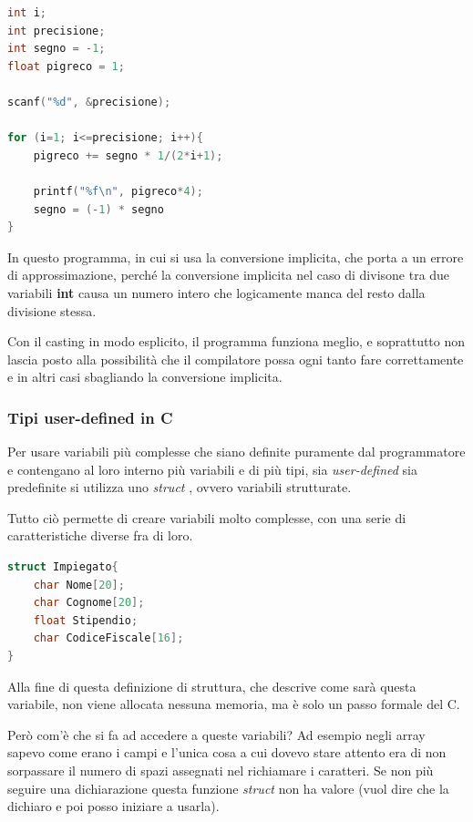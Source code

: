 \documentclass[
  paper=a4,
  oneside  ,captions=tableheading
]{scrbook}
\begin{document}
\begin{lstlisting}[language=C]
int i;
int precisione;
int segno = -1;
float pigreco = 1;

scanf("%d", &precisione);

for (i=1; i<=precisione; i++){
    pigreco += segno * 1/(2*i+1);
    
    printf("%f\n", pigreco*4);
    segno = (-1) * segno
}
\end{lstlisting}

In questo programma, in cui si usa la conversione implicita, che porta a
un errore di approssimazione, perché la conversione implicita nel caso
di divisone tra due variabili \textbf{int} causa un numero intero che
logicamente manca del resto dalla divisione stessa.

Con il casting in modo esplicito, il programma funziona meglio, e
soprattutto non lascia posto alla possibilità che il compilatore possa
ogni tanto fare correttamente e in altri casi sbagliando la conversione
implicita.

\hypertarget{tipi-user-defined-in-c}{%
\subsubsection{Tipi user-defined in C}\label{tipi-user-defined-in-c}}

Per usare variabili più complesse che siano definite puramente dal
programmatore e contengano al loro interno più variabili e di più tipi,
sia \emph{user-defined} sia predefinite si utilizza uno \emph{struct} ,
ovvero variabili strutturate.

Tutto ciò permette di creare variabili molto complesse, con una serie di
caratteristiche diverse fra di loro.

\begin{lstlisting}[language=C]
struct Impiegato{
    char Nome[20];
    char Cognome[20];
    float Stipendio;
    char CodiceFiscale[16];
}
\end{lstlisting}

Alla fine di questa definizione di struttura, che descrive come sarà
questa variabile, non viene allocata nessuna memoria, ma è solo un passo
formale del C.

Però com'è che si fa ad accedere a queste variabili? Ad esempio negli
array sapevo come erano i campi e l'unica cosa a cui dovevo stare
attento era di non sorpassare il numero di spazi assegnati nel
richiamare i caratteri. Se non più seguire una dichiarazione questa
funzione \emph{struct} non ha valore (vuol dire che la dichiaro e poi
posso iniziare a usarla).
\end{document}
